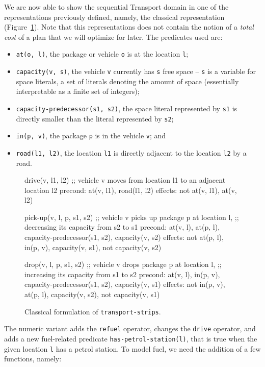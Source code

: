 We are now able to show the sequential Transport domain in one of the representations
previously defined, namely,
the classical representation (Figure~\ref{code:classical-strips}).
Note that this representations does not contain the notion of a \textit{total cost}
of a plan that we will optimize for later.
The predicates used are:

\begin{itemize}
\item \verb+at(o, l)+, the package or vehicle \verb+o+ is at the
location \verb+l+;
\item \verb+capacity(v, s)+, the vehicle \verb+v+ currently has \verb+s+ free space -- \verb+s+ is a variable for space literals, a set of literals denoting the amount of space (essentially interpretable as a finite set of integers);
\item \verb+capacity-predecessor(s1, s2)+, the space literal represented by \verb+s1+
is directly smaller than the literal represented by \verb+s2+;
\item \verb+in(p, v)+, the package \verb+p+ is in the vehicle \verb+v+; and
\item \verb+road(l1, l2)+, the location \verb+l1+ is directly adjacent to the location
\verb+l2+ by a road.
\end{itemize}

\begin{figure}[tb]
\begin{code}
drive(v, l1, l2)
  ;; vehicle v moves from location l1 to an adjacent location l2
  precond: at(v, l1), road(l1, l2)
  effects: not at(v, l1), at(v, l2)

pick-up(v, l, p, s1, s2)
  ;; vehicle v picks up package p at location l,
  ;; decreasing its capacity from s2 to s1
  precond: at(v, l), at(p, l), capacity-predecessor(s1, s2),
           capacity(v, s2)
  effects: not at(p, l), in(p, v), capacity(v, s1),
           not capacity(v, s2)
  
drop(v, l, p, s1, s2)
  ;; vehicle v drops package p at location l,
  ;; increasing its capacity from s1 to s2
  precond: at(v, l), in(p, v), capacity-predecessor(s1, s2),
           capacity(v, s1)
  effects: not in(p, v), at(p, l), capacity(v, s2),
           not capacity(v, s1)
\end{code}
\caption{Classical formulation of \texttt{transport-strips}.}
\label{code:classical-strips}
\end{figure}

The numeric variant  adds the \verb+refuel+ operator, changes the \verb+drive+
operator, and adds a new fuel-related predicate \verb+has-petrol-station(l)+, that is true when the given location \verb+l+ has
a petrol station.
To model fuel, we need the addition of a few functions, namely:

